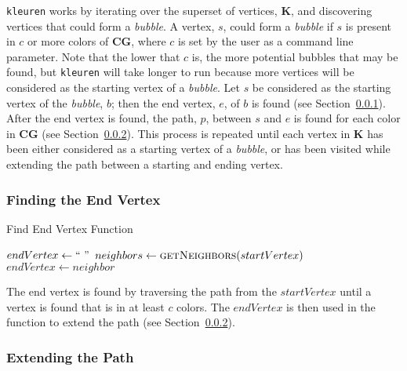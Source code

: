 \documentclass[hidelinks, 10pt, conference, compsocconf]{IEEEtran}
\begin{document}
\texttt{kleuren} works by iterating over the superset of vertices, $\mathbf{K}$, and discovering vertices that could form a \textit{bubble}.
A vertex, $s$, could form a \textit{bubble} if $s$ is present in $c$ or more colors of $\mathbf{CG}$, where $c$ is set by the user as a command line parameter.
Note that the lower that $c$ is, the more potential bubbles that may be found, but \texttt{kleuren} will take longer to run because more vertices will be considered as the starting vertex of a \textit{bubble}.
Let $s$ be considered as the starting vertex of the \textit{bubble}, $b$; then the end vertex, $e$, of $b$ is found (see Section~\ref{findEndVertex}).
After the end vertex is found, the path, $p$, between $s$ and $e$ is found for each color in $\mathbf{CG}$ (see Section~\ref{extendPath}).
This process is repeated until each vertex in $\mathbf{K}$ has been either considered as a starting vertex of a \textit{bubble}, or has been visited while extending the path between a starting and ending vertex.

\subsubsection{Finding the End Vertex}\label{findEndVertex}

\begin{algorithm}
\caption{Find End Vertex Function}\label{findEndVertexAlg}
\begin{algorithmic}[1]
    	\State $endVertex \gets ``~"$ 
        \State $neighbors \gets \Call{getNeighbors}{startVertex}$
                	\State $endVertex \gets neighbor$
                \EndIf
            \EndFor
        \EndWhile
        \State {}
    \EndFunction
\end{algorithmic}
\end{algorithm}

The end vertex is found by traversing the path from the $startVertex$ until a vertex is found that is in at least $c$ colors.
The $endVertex$ is then used in the function to extend the path (see Section~\ref{extendPath}). 

\subsubsection{Extending the Path}\label{extendPath}
\end{document}
